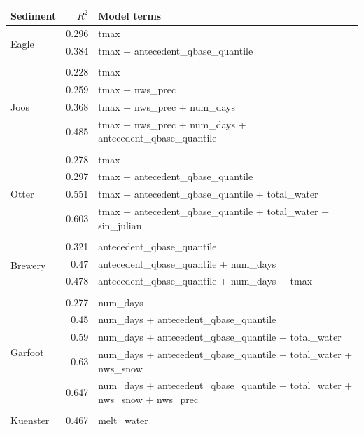 \documentclass[10pt]{article}
\begin{document}
\begin{table}[h] \small
    \begin{center}
    \begin{tabular}{lrl}
    \textbf{Sediment} & $R^2$ & Model terms \\
    \hline
\multirow{3}{*}{Eagle} & 0.296 & tmax\\ 
 & 0.384 & tmax + antecedent\_qbase\_quantile\\ 
\vspace{2mm}\\ \multirow{5}{*}{Joos} & 0.228 & tmax\\ 
 & 0.259 & tmax + nws\_prec\\ 
 & 0.368 & tmax + nws\_prec + num\_days\\ 
 & 0.485 & tmax + nws\_prec + num\_days + antecedent\_qbase\_quantile\\ 
\vspace{2mm}\\ \multirow{5}{*}{Otter} & 0.278 & tmax\\ 
 & 0.297 & tmax + antecedent\_qbase\_quantile\\ 
 & 0.551 & tmax + antecedent\_qbase\_quantile + total\_water\\ 
 & 0.603 & tmax + antecedent\_qbase\_quantile + total\_water + sin\_julian\\ 
\vspace{2mm}\\ \multirow{4}{*}{Brewery} & 0.321 & antecedent\_qbase\_quantile\\ 
 & 0.47 & antecedent\_qbase\_quantile + num\_days\\ 
 & 0.478 & antecedent\_qbase\_quantile + num\_days + tmax\\ 
\vspace{2mm}\\ \multirow{6}{*}{Garfoot} & 0.277 & num\_days\\ 
 & 0.45 & num\_days + antecedent\_qbase\_quantile\\ 
 & 0.59 & num\_days + antecedent\_qbase\_quantile + total\_water\\ 
 & 0.63 & num\_days + antecedent\_qbase\_quantile + total\_water + nws\_snow\\ 
 & 0.647 & num\_days + antecedent\_qbase\_quantile + total\_water + nws\_snow + nws\_prec\\ 
\vspace{2mm}\\ \multirow{4}{*}{Kuenster} & 0.467 & melt\_water\\ 

\end{tabular}
\end{center}
\end{table}
\end{document}
